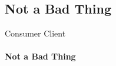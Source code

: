 \subsection{Not a Bad Thing}

\begin{frame}{Consumer Client}
    \framesubtitle{Not a Bad Thing}

\end{frame}
